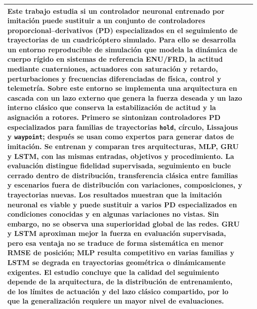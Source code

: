 \begin{tabular}{|p{}|p{}|}
{Este trabajo estudia si un controlador neuronal entrenado por imitación puede sustituir a un conjunto de controladores proporcional--derivativos (PD) especializados en el seguimiento de trayectorias de un cuadricóptero simulado. Para ello se desarrolla un entorno reproducible de simulación que modela la dinámica de cuerpo rígido en sistemas de referencia ENU/FRD, la actitud mediante cuaterniones, actuadores con saturación y retardo, perturbaciones y frecuencias diferenciadas de física, control y telemetría. Sobre este entorno se implementa una arquitectura en cascada con un lazo externo que genera la fuerza deseada y un lazo interno clásico que conserva la estabilización de actitud y la asignación a rotores. Primero se sintonizan controladores PD especializados para familias de trayectorias \texttt{hold}, círculo, Lissajous y \texttt{waypoint}; después se usan como expertos para generar datos de imitación. Se entrenan y comparan tres arquitecturas, MLP, GRU y LSTM, con las mismas entradas, objetivos y procedimiento. La evaluación distingue fidelidad supervisada, seguimiento en bucle cerrado dentro de distribución, transferencia clásica entre familias y escenarios fuera de distribución con variaciones, composiciones, y trayectorias nuevas. Los resultados muestran que la imitación neuronal es viable y puede sustituir a varios PD especializados en condiciones conocidas y en algunas variaciones no vistas. Sin embargo, no se observa una superioridad global de las redes. GRU y LSTM aproximan mejor la fuerza en evaluación supervisada, pero esa ventaja no se traduce de forma sistemática en menor RMSE de posición; MLP resulta competitivo en varias familias y LSTM se degrada en trayectorias geométrica o dinámicamente exigentes. El estudio concluye que la calidad del seguimiento depende de la arquitectura, de la distribución de entrenamiento, de los límites de actuación y del lazo clásico compartido, por lo que la generalización requiere un mayor nivel de evaluaciones.} \\
\hline
\end{tabular}


